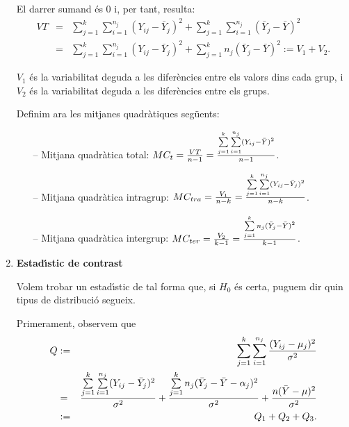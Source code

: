 \begin{enumerate}
El darrer sumand \'es $0$ i, per tant, resulta:
\begin{eqnarray*}
VT & = & \sum\limits_{j=1}^k \sum\limits_{i=1}^{n_j} (Y_{ij} - \bar{Y}_j)^2 +
\sum\limits_{j=1}^k \sum\limits_{i=1}^{n_j} (\bar{Y}_j - \bar{Y})^2 \\
& = &
\sum\limits_{j=1}^k \sum\limits_{i=1}^{n_j} (Y_{ij} - \bar{Y}_j)^2 +
\sum\limits_{j=1}^k n_j (\bar{Y}_j - \bar{Y})^2 := V_1 + V_2.
\end{eqnarray*}

$V_1$ \'es la variabilitat deguda a les difer\`encies entre els valors dins cada
grup, i $V_2$ \'es la variabilitat deguda a les difer\`encies entre els grups.

Definim ara les mitjanes quadr\`atiques seg\"uents:
\begin{itemize}
\item[--] Mitjana quadr\`atica total: $MC_t = {VT \over n-1} = {\sum\limits_{j=1}^k
\sum\limits_{i=1}^{n_j} (Y_{ij} - \bar{Y})^2 \over n-1}$.

\item[--] Mitjana quadr\`atica intragrup: $MC_{tra} = {V_1 \over n-k} =
{\sum\limits_{j=1}^k \sum\limits_{i=1}^{n_j} (Y_{ij} - \bar{Y}_j)^2 \over n-k}$.

\item[--] Mitjana quadr\`atica intergrup: $MC_{ter} = {V_2 \over k-1} =
{\sum\limits_{j=1}^k n_j (\bar{Y}_j - \bar{Y})^2 \over k-1}$.
\end{itemize}

\item {\bf Estad\'{\i}stic de contrast}

Volem trobar un estad\'{\i}stic de tal forma que, si $H_0$ \'es certa, puguem dir quin
tipus de distribuci\'o segueix.

Primerament, observem que
\begin{eqnarray*}
Q &:= & \sum\limits_{j=1}^k \sum\limits_{i=1}^{n_j} {(Y_{ij} - \mu_j)^2 \over
\sigma^2} \\ & = &  {\sum\limits_{j=1}^k \sum\limits_{i=1}^{n_j} (Y_{ij} - \bar{Y}_j)^2
\over \sigma^2} + {\sum\limits_{j=1}^k n_j (\bar{Y}_j - \bar{Y} - \alpha_j)^2
\over \sigma^2} + {n (\bar{Y} - \mu)^2 \over \sigma^2} \\ & := & Q_1 + Q_2 + Q_3.
\end{eqnarray*}


\end{enumerate}
